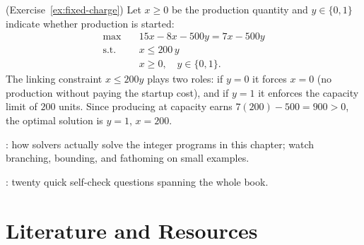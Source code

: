 \begin{solution}(Exercise~\ref{ex:fixed-charge})
Let $x \geq 0$ be the production quantity and $y \in \{0,1\}$ indicate whether production is started:
\[
\begin{aligned}
\max\quad & 15x - 8x - 500y = 7x - 500y\\
\text{s.t.}\quad & x \leq 200\,y\\
& x \geq 0, \quad y \in \{0,1\}.
\end{aligned}
\]
The linking constraint $x \leq 200y$ plays two roles: if $y = 0$ it forces $x = 0$ (no production without paying the startup cost), and if $y = 1$ it enforces the capacity limit of $200$ units.  Since producing at capacity earns $7(200) - 500 = 900 > 0$, the optimal solution is $y = 1$, $x = 200$.
\end{solution}

\begin{tryit}
: how solvers actually solve the integer programs in this chapter; watch branching, bounding, and fathoming on small examples.

: twenty quick self-check questions spanning the whole book.
\end{tryit}

\section{Literature and Resources}

